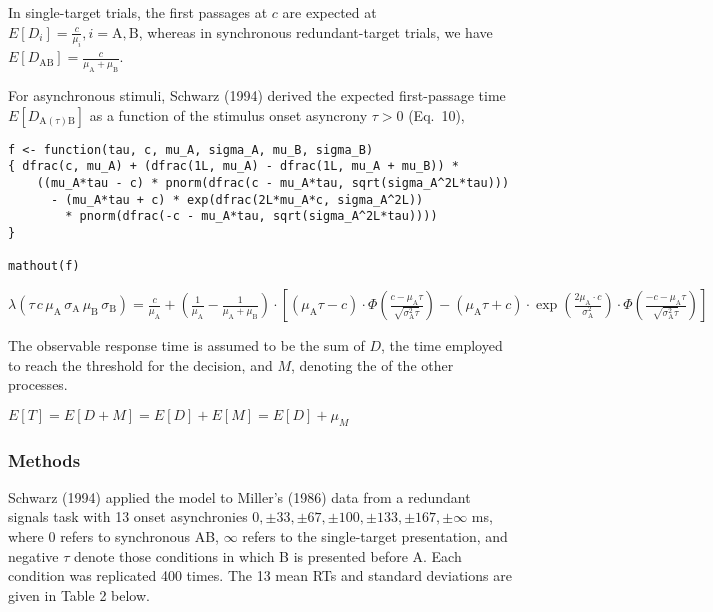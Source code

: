 In single-target trials, the first passages at \(c\) are expected at
\(E\left[D_i\right] = \frac{c}{\mu_i}, i = \mathrm{A, B}\), whereas in synchronous
redundant-target trials, we have
\(E[D_\mathrm{AB}]= \frac{c}{\mu_\mathrm A + \mu_\mathrm B}\).

For asynchronous stimuli, Schwarz (1994) derived the expected
first-passage time \(E[D_{\mathrm A(\tau)\mathrm B}]\) as a function of the
stimulus onset asyncrony \(\tau > 0\) (Eq.~10),

\begin{verbatim}
f <- function(tau, c, mu_A, sigma_A, mu_B, sigma_B)
{ dfrac(c, mu_A) + (dfrac(1L, mu_A) - dfrac(1L, mu_A + mu_B)) *
    ((mu_A*tau - c) * pnorm(dfrac(c - mu_A*tau, sqrt(sigma_A^2L*tau)))
      - (mu_A*tau + c) * exp(dfrac(2L*mu_A*c, sigma_A^2L))
        * pnorm(dfrac(-c - mu_A*tau, sqrt(sigma_A^2L*tau))))
}

mathout(f)
\end{verbatim}

\({{\lambda\left({\tau{\,{c}{\,{\mu_\mathrm{A}}{\,{\sigma_\mathrm{A}}{\,{\mu_\mathrm{B}}{\,{\sigma_\mathrm{B}}}}}}}}\right)}={\displaystyle{\frac{{c}}{{\mu_\mathrm{A}}}}+{\left({\displaystyle{\frac{{1}}{{\mu_\mathrm{A}}}}-\displaystyle{\frac{{1}}{{{\mu_\mathrm{A}}+{\mu_\mathrm{B}}}}}}\right)\cdot\left[{{\left({{{\mu_\mathrm{A}}{}\tau}-{c}}\right)\cdot{\Phi\left(\displaystyle{\frac{{{c}-{{\mu_\mathrm{A}}{}\tau}}}{\sqrt{{{\sigma_\mathrm{A}^{2}}{}\tau}}}}\right)}}-{{\left({{{\mu_\mathrm{A}}{}\tau}+{c}}\right)\cdot{\exp\left(\displaystyle{\frac{{{{2}{}{\mu_\mathrm{A}}}\cdot{c}}}{{\sigma_\mathrm{A}^{2}}}}\right)}}\cdot{\Phi\left(\displaystyle{\frac{{{-{c}}-{{\mu_\mathrm{A}}{}\tau}}}{\sqrt{{{\sigma_\mathrm{A}^{2}}{}\tau}}}}\right)}}}\right]}}}\)

The observable response time is assumed to be the sum of \(D\), the time
employed to reach the threshold for the decision, and \(M\), denoting the of the
other processes.

\(E[T]= E[D + M] = E[D] + E[M] = E[D] + \mu_M\)

\hypertarget{methods}{%
\subsubsection{Methods}\label{methods}}

Schwarz (1994) applied the model to Miller's (1986) data from
a redundant signals task with 13 onset
asynchronies \(0, \pm33, \pm67, \pm100, \pm133, \pm167, \pm\infty\) ms,
where 0 refers to synchronous AB, \(\infty\) refers to the single-target
presentation, and negative \(\tau\) denote those conditions in which B is
presented before A. Each condition was replicated 400 times. The 13 mean RTs and
standard deviations are given in Table 2 below.

